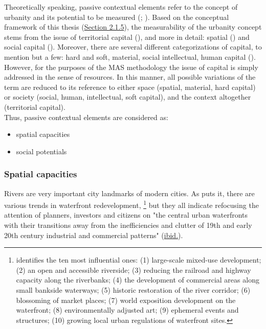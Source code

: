\documentclass[11pt]{report}
\begin{document}
{{{{Theoretically speaking, passive contextual elements refer to the concept of urbanity and its potential to be measured (\href{ref}{\citealt{marcus_spatial_2007}}; \href{ref}{\citealt{vujosevic_postsocijalisticka_2010}}).
Based on the conceptual framework of this thesis (\href{Section 2.1.5}{Section 2.1.5}),
the measurability of the urbanity concept stems from the issue of territorial capital (\href{ref}{\citealt{camagni_regional_2013}}), and more in detail: spatial (\href{ref}{\citealt{marcus_spatial_2007}}) and social capital (\href{ref}{\citealt{golubovic_mrezna_2009}}).
Moreover, there are several different categorizations of capital, to mention but a few: hard and soft, material, social intellectual, human capital  (\href{ref}{\citealt{healey_collaborative_1997}}). %
\\

However, for the purposes of the MAS methodology the issue of capital is simply addressed in the sense of resources.
In this manner, all possible variations of the term are reduced to its reference to either space (spatial, material, hard capital) or society (social, human, intellectual, soft capital), and the context altogether (territorial capital).
\\

Thus, passive contextual elements are considered as:
\begin{itemize}
\item spatial capacities
\item social potentials
\end{itemize}

\subsubsection{Spatial capacities}

Rivers are very important city landmarks of modern cities. %
As \href{Mann1988}{\cite{mann_ten_1988}} puts it, there are various trends in waterfront redevelopment,
\footnote{\href{Mann1988}{\cite{mann_ten_1988}} identifies the ten most influential ones:
(1) large-scale mixed-use development;
(2) an open and accessible riverside;
(3) reducing the railroad and highway capacity along the riverbanks;
(4) the development of commercial areas along small bankside waterways; 
(5) historic restoration of the river corridor;
(6) blossoming of market places;
(7) world exposition development on the waterfront;
(8) environmentally adjusted art;
(9) ephemeral events and structures;
(10) growing local urban regulations of waterfront sites.}
but they all indicate refocusing the attention of planners, investors and citizens on "the central urban waterfronts with their transitions away from the inefficiencies and clutter of 19th and early 20th century industrial and commercial patterns" (\href{Mann1988}{ibid.}).
\\

}}}}
\end{document}

